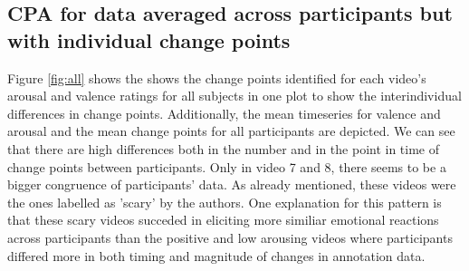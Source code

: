 \documentclass[11pt, letterpaper]{article}
\begin{document}
\begin{table}[]
\centering
\caption{\textit{X-Coordinates (timestamps) of change points for all videos averaged across participants.} Q = Quadrant (video category); HP = high arousal and positive valence; LN = low arousal and negative valence; LP = low arousal and positive valence; HN = high arousal and negative valence; CP = change point; No. = number.}
\label{tab:table_avg_cpa}
\end{table}

\newpage

\subsection{CPA for data averaged across participants but with individual change points}
Figure \ref{fig:all} shows the shows the change points identified for each video's arousal and valence ratings for all subjects in one plot to show the interindividual differences in change points. Additionally, the mean timeseries for valence and arousal and the mean change points for all participants are depicted. We can see that there are high differences both in the number and in the point in time of change points between participants. Only in video 7 and 8, there seems to be a bigger congruence of participants' data. As already mentioned, these videos were the ones labelled as 'scary' by the authors. One explanation for this pattern is that these scary videos succeded in eliciting more similiar emotional reactions across participants than the positive and low arousing videos where participants differed more in both timing and magnitude of changes in annotation data.
\end{document}
